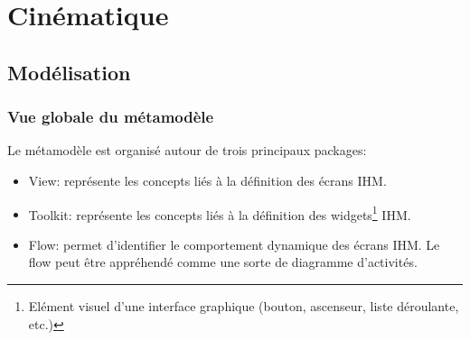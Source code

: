 \section{Cinématique}
\subsection{Modélisation}
\subsubsection{Vue globale du métamodèle}
Le métamodèle est organisé autour de trois principaux packages:
\begin{itemize}
  \item View: représente les concepts liés à la définition des écrans IHM.
  \item Toolkit: représente les concepts liés à la définition des
  widgets\footnote{Elément visuel d'une interface graphique (bouton, ascenseur,
  liste déroulante, etc.)} IHM.
  \item Flow: permet d'identifier le comportement dynamique des écrans IHM.
  Le flow peut être appréhendé comme une sorte de diagramme d'activités.
\end{itemize}
